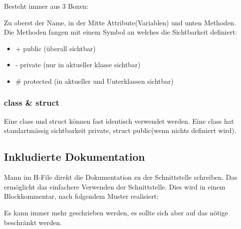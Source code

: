 Besteht immer aus 3 Boxen:

\begin{center}
\end{center}

Zu oberst der Name, in der Mitte Attribute(Variablen) und unten Methoden.\\
Die Methoden fangen mit einem Symbol an welches die Sichtbarkeit definiert:
\begin{itemize}[itemsep=1pt, parsep=0pt]
    \item + public (überall sichtbar)
    \item - private (nur in  aktueller klasse sichtbar)
    \item \# protected (in aktueller und Unterklassen sichtbar)
\end{itemize}


\subsubsection{class \& struct}

Eine class und struct können fast identisch verwendet werden. 
Eine class hat standartmässig sichtbarkeit private, struct public(wenn nichts definiert wird).


\subsection{Inkludierte Dokumentation}

Mann im H-File direkt die Dokumentation zu der Schnittstelle schreiben. 
Das ermöglicht das einfachere Verwenden der Schnittstelle.
Dies wird in einem Blockkommentar, nach folgendem Muster realisiert:



Es kann immer mehr geschrieben werden, es sollte sich aber auf das nötige beschränkt werden.

